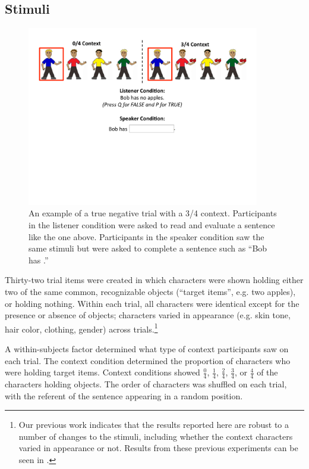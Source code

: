 \documentclass[man]{apa2}
\begin{document}
\subsection{Stimuli}

\begin{figure}[t]
\begin{center} 
\includegraphics[width=4in]{figures/trialfig.pdf}
\caption{\label{fig:trial} An example of a true negative trial with a 3/4 context. Participants in the listener condition were asked to read and evaluate a sentence like the one above.  Participants in the speaker condition saw the same stimuli but were asked to complete a sentence such as ``Bob has  \textunderscore\textunderscore\textunderscore\textunderscore\textunderscore\textunderscore\textunderscore\textunderscore\textunderscore\textunderscore.''}
\vspace{-5mm}
\end{center} 
\end{figure}

Thirty-two trial items were created in which characters were shown holding either two of the same common, recognizable objects (``target items'', e.g. two apples), or holding nothing.  Within each trial, all characters were identical except for the presence or absence of objects; characters varied in appearance (e.g. skin tone, hair color, clothing, gender) across trials.\footnote{Our previous work indicates that the results reported here are robust to a number of changes to the stimuli, including whether the context characters varied in appearance or not.  Results from these previous experiments can be seen in .}

A within-subjects factor determined what type of context participants saw on each trial.  The context condition determined the proportion of characters who were holding target items.  Context conditions showed $\frac{0}{4}$, $\frac{1}{4}$, $\frac{2}{4}$, $\frac{3}{4}$, or $\frac{4}{4}$ of the characters holding objects. The order of characters was shuffled on each trial, with the referent of the sentence appearing in a random position.  
\end{document}
